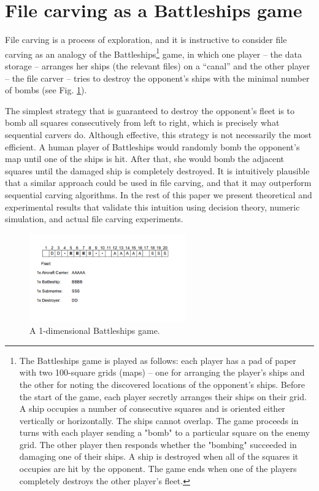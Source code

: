 \documentclass[final,5p,times,twocolumn,authoryear]{elsarticle}
\begin{document}
\section{File carving as a Battleships game}

File carving is a process of exploration, and it is instructive to consider file carving as an analogy of the Battleships\footnote{The Battleships game is played as follows: each player has a pad of paper with two 100-square grids (maps) -- one for arranging the player's ships and the other for noting the discovered locations of the opponent's ships. Before the start of the game, each player secretly arranges their ships on their grid. A ship occupies a number of consecutive squares and is oriented either vertically or horizontally. The ships cannot overlap. The game proceeds in turns with each player sending a "bomb" to a particular square on the enemy grid. The other player then responds whether the "bombing" succeeded in damaging one of their ships. A ship is destroyed when all of the squares it occupies are hit by the opponent. The game ends when one of the players completely destroys the other player's fleet.} game, in which one player -- the data storage -- arranges her ships (the relevant files) on a ``canal'' and the other player -- the file carver -- tries to destroy the opponent's ships with the minimal number of bombs (see Fig. \ref{fig:battleships_on_a_canal}).

The simplest strategy that is guaranteed to destroy the opponent's fleet is to bomb all squares consecutively from left to right, which is precisely what sequential carvers do. Although effective, this strategy is not necessarily the most efficient. A human player of Battleships would randomly bomb the opponent's map until one of the ships is hit. After that, she would bomb the adjacent squares until the damaged ship is completely destroyed. It is intuitively plausible that a similar approach could be used in file carving, and that it may outperform sequential carving algorithms. In the rest of this paper we present theoretical and experimental results that validate this intuition using decision theory, numeric simulation, and actual file carving experiments.

\begin{figure}
  \centerline{\includegraphics[width=0.6\textwidth]{fig3}}
  \caption{A 1-dimensional Battleships game.}
  \label{fig:battleships_on_a_canal}
\end{figure}
\end{document}
